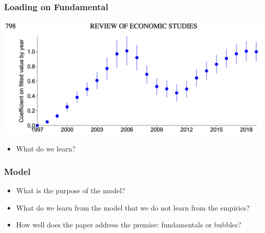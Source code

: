 \documentclass[english,xcolor=svgnames]{beamer}
\begin{document}
\begin{frame}
	\frametitle[alignment=center]{Loading on Fundamental}
	\centering
	\includegraphics[scale=0.4]{figures/CGMFIG5.png}
	\begin{itemize}
		\item What do we learn?
	\end{itemize}
\end{frame}

\begin{frame}
	\frametitle[alignment=center]{Model}
	\begin{itemize}
		\item What is the purpose of the model?
		\item What do we learn from the model that we do not learn from the empirics?
		\item How well does the paper address the premise: fundamentals or bubbles?
	\end{itemize}
\end{frame}
\end{document}
